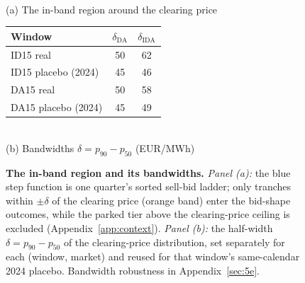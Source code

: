 \documentclass[11pt,a4paper]{article}
\theoremstyle{definition}
\theoremstyle{remark}
\theoremstyle{plain}
\begin{document}
\begin{figure}[htbp]
\begin{minipage}[c]{0.60\textwidth}
\\[3pt]
{\footnotesize (a) The in-band region around the clearing price}
\end{minipage}\hfill
\begin{minipage}[c]{0.37\textwidth}
\centering
\footnotesize
\setlength{\tabcolsep}{5pt}
\begin{tabular}{l c c}
\toprule
\textbf{Window} & $\delta_{\text{DA}}$ & $\delta_{\text{IDA}}$ \\
\midrule
ID15 real             & 50 & 62 \\
ID15 placebo (2024)   & 45 & 46 \\
DA15 real             & 50 & 58 \\
DA15 placebo (2024)   & 45 & 49 \\
\bottomrule
\end{tabular}\\[3pt]
{\footnotesize (b) Bandwidths $\delta=p_{90}-p_{50}$ (EUR/MWh)}
\end{minipage}
\caption{\textbf{The in-band region and its bandwidths.} \emph{Panel (a):} the blue step function is one quarter's sorted sell-bid ladder; only tranches within $\pm\delta$ of the clearing price (orange band) enter the bid-shape outcomes, while the parked tier above the clearing-price ceiling is excluded (Appendix~\ref{app:context}). \emph{Panel (b):} the half-width $\delta=p_{90}-p_{50}$ of the clearing-price distribution, set separately for each (window, market) and reused for that window's same-calendar 2024 placebo. Bandwidth robustness in Appendix~\ref{sec:5e}.}
\label{fig:in-band-bandwidth}
\end{figure}
\end{document}
